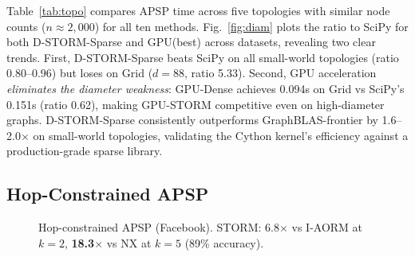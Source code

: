 \documentclass[journal]{IEEEtran}
\begin{document}
Table~\ref{tab:topo} compares APSP time across five topologies with similar node counts ($n \approx 2{,}000$) for all ten methods. Fig.~\ref{fig:diam} plots the ratio to SciPy for both D-STORM-Sparse and GPU(best) across datasets, revealing two clear trends. First, D-STORM-Sparse beats SciPy on all small-world topologies (ratio 0.80--0.96) but loses on Grid ($d=88$, ratio 5.33). Second, GPU acceleration \emph{eliminates the diameter weakness}: GPU-Dense achieves 0.094s on Grid vs SciPy's 0.151s (ratio 0.62), making GPU-STORM competitive even on high-diameter graphs. D-STORM-Sparse consistently outperforms GraphBLAS-frontier by 1.6--2.0$\times$ on small-world topologies, validating the Cython kernel's efficiency against a production-grade sparse library.


\subsection{Hop-Constrained APSP}

\begin{figure}[t]
\centering
{}
\caption{Hop-constrained APSP (Facebook). STORM: 6.8$\times$ vs I-AORM at $k\!=\!2$, \textbf{18.3$\times$} vs NX at $k\!=\!5$ (89\% accuracy).}
\label{fig:hop}
\end{figure}
\end{document}
